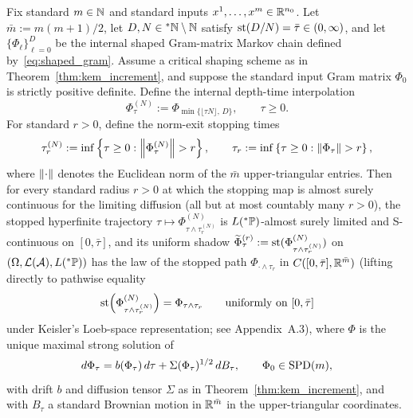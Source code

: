 \begin{theorem}\label{thm:neural_cov_sde}
Fix standard $m \in \mathbb{N}$ and standard inputs $x^1, \dots, x^m \in \mathbb{R}^{n_0}$. Let $\bar{m} := m(m+1)/2$, let $D, N \in {}^*\mathbb{N} \setminus \mathbb{N}$ satisfy $\operatorname{st}(D/N) = \bar{\tau} \in (0, \infty)$, and let $\{\Phi_\ell\}_{\ell=0}^D$ be the internal shaped Gram-matrix Markov chain defined by~\eqref{eq:shaped_gram}. Assume a critical shaping scheme as in Theorem~\ref{thm:kem_increment}, and suppose the standard input Gram matrix $\Phi_0$ is strictly positive definite. Define the internal depth-time interpolation
\begin{equation}\label{eq:shaped_interp}
\Phi_\tau^{(N)} := \Phi_{\min\{\lfloor \tau N \rfloor,\, D\}}, \qquad \tau \ge 0.
\end{equation}
For standard $r > 0$, define the norm-exit stopping times
\begin{equation}\label{eq:norm_exit_times}
\tau_r^{(N)} := \inf\left\{\tau \ge 0 : \left\lVert \Phi_\tau^{(N)} \right\rVert > r\right\}, \qquad \tau_r := \inf\left\{\tau \ge 0 : \left\lVert \Phi_\tau \right\rVert > r\right\},
\end{equation}
where $\left\lVert \cdot \right\rVert$ denotes the Euclidean norm of the $\bar{m}$ upper-triangular entries. Then for every standard radius $r > 0$ at which the stopping map is almost surely continuous for the limiting diffusion (all but at most countably many $r > 0$), the stopped hyperfinite trajectory $\tau \mapsto \Phi_{\tau \wedge \tau_r^{(N)}}^{(N)}$ is $L({}^*\mathbb{P})$-almost surely limited and S-continuous on $[0, \bar{\tau}]$, and its uniform shadow $\widetilde{\Phi}^{(r)}_\tau := \operatorname{st}(\Phi_{\tau \wedge \tau_r^{(N)}}^{(N)})$ on $(\Omega, \mathcal{L}(\mathcal{A}), L({}^*\mathbb{P}))$ has the law of the stopped path $\Phi_{\cdot \wedge \tau_r}$ in $C([0, \bar{\tau}], \mathbb{R}^{\bar{m}})$ (lifting directly to pathwise equality
\begin{equation}\label{eq:stopped_shadow_conv}
\operatorname{st}\!\left(\Phi_{\tau \wedge \tau_r^{(N)}}^{(N)}\right) = \Phi_{\tau \wedge \tau_r} \qquad \text{uniformly on } [0, \bar{\tau}]
\end{equation}
under Keisler's Loeb-space representation; see Appendix~A.3), where $\Phi$ is the unique maximal strong solution of
\begin{equation}\label{eq:neural_cov_sde}
d\Phi_\tau = b(\Phi_\tau)\,d\tau + \Sigma(\Phi_\tau)^{1/2}\,dB_\tau, \qquad \Phi_0 \in \operatorname{SPD}(m),
\end{equation}
with drift $b$ and diffusion tensor $\Sigma$ as in Theorem~\ref{thm:kem_increment}, and with $B_\tau$ a standard Brownian motion in $\mathbb{R}^{\bar{m}}$ in the upper-triangular coordinates.
\end{theorem}

